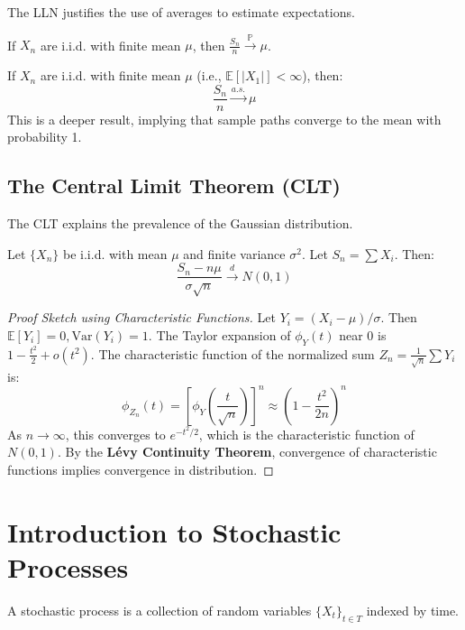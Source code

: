 The LLN justifies the use of averages to estimate expectations.

\begin{theorem}
If $X_n$ are i.i.d. with finite mean $\mu$, then $\frac{S_n}{n} \xrightarrow{\mathbb{P}} \mu$.
\end{theorem}

\begin{theorem}
If $X_n$ are i.i.d. with finite mean $\mu$ (i.e., $\mathbb{E}[|X_1|] < \infty$), then:
\[ \frac{S_n}{n} \xrightarrow{a.s.} \mu \]
This is a deeper result, implying that sample paths converge to the mean with probability 1.
\end{theorem}

\subsection{The Central Limit Theorem (CLT)}

The CLT explains the prevalence of the Gaussian distribution.

\begin{theorem}
Let $\{X_n\}$ be i.i.d. with mean $\mu$ and finite variance $\sigma^2$. Let $S_n = \sum X_i$. Then:
\[ \frac{S_n - n\mu}{\sigma\sqrt{n}} \xrightarrow{d} N(0, 1) \]
\end{theorem}

\begin{proof}[Proof Sketch using Characteristic Functions]
Let $Y_i = (X_i - \mu)/\sigma$. Then $\mathbb{E}[Y_i]=0, \text{Var}(Y_i)=1$.
The Taylor expansion of $\phi_Y(t)$ near 0 is $1 - \frac{t^2}{2} + o(t^2)$.
The characteristic function of the normalized sum $Z_n = \frac{1}{\sqrt{n}}\sum Y_i$ is:
\[ \phi_{Z_n}(t) = \left[ \phi_Y\left(\frac{t}{\sqrt{n}}\right) \right]^n \approx \left( 1 - \frac{t^2}{2n} \right)^n \]
As $n \to \infty$, this converges to $e^{-t^2/2}$, which is the characteristic function of $N(0,1)$. By the \textbf{Lévy Continuity Theorem}, convergence of characteristic functions implies convergence in distribution.
\end{proof}

\section{Introduction to Stochastic Processes}

A stochastic process is a collection of random variables $\{X_t\}_{t \in T}$ indexed by time.

